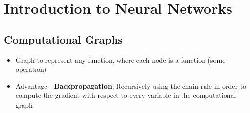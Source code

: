 \section{Introduction to Neural Networks}
\subsection{Computational Graphs}
\begin{itemize}
	\item Graph to represent any function, where each node is a function (some operation)
	\item Advantage - \textbf{Backpropagation}: Recursively using the chain rule in order to compute the gradient with respect to every variable in the computational graph
\end{itemize}

